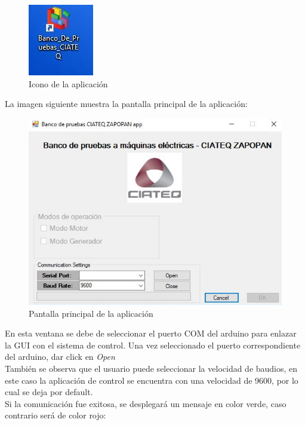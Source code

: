 \documentclass[12pt,titlepage]{article}
\begin{document}
\begin{figure}[htbp]
\hspace*{6.9cm} 
\includegraphics[scale=0.92]{icono}
\caption{Icono de la aplicación}
\end{figure}

La imagen siguiente muestra la pantalla principal de la aplicación:  \\

\begin{figure}[htbp]
\hspace*{2.8cm} 
\includegraphics[scale=0.72]{main_screen}
\caption{Pantalla principal de la aplicación}
\end{figure}

En esta  ventana se debe de seleccionar el puerto COM del arduino para enlazar la GUI con el sistema de control. Una vez seleccionado el puerto correspondiente del arduino, dar click en \textit{Open} \\

También se observa que el usuario puede seleccionar la velocidad de baudios, en este caso la aplicación de control se encuentra con una velocidad de 9600, por lo cual se deja por default. \\

\newpage
Si la comunicación fue exitosa, se desplegará un mensaje en color verde, caso contrario será de color rojo: \\
\end{document}
